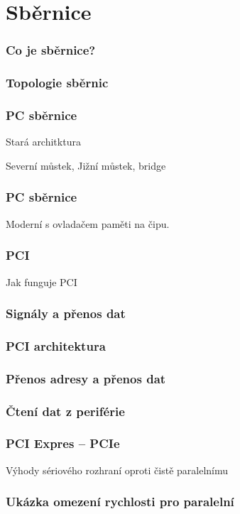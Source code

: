 \documentclass{beamer}
\begin{document}
\section{Sběrnice}

\begin{frame}
\frametitle{Co je sběrnice?}

\end{frame}

\begin{frame}
\frametitle{Topologie sběrnic}

\end{frame}

\begin{frame}
\frametitle{PC sběrnice}
Stará architktura

Severní můstek, Jižní můstek, bridge
\end{frame}

\begin{frame}
\frametitle{PC sběrnice}

Moderní s ovladačem paměti na čipu.
\end{frame}

\begin{frame}
\frametitle{PCI}

Jak funguje PCI
\end{frame}

\begin{frame}
\frametitle{Signály a přenos dat}

\end{frame}

\begin{frame}
\frametitle{PCI architektura}

\end{frame}

\begin{frame}
\frametitle{Přenos adresy a přenos dat}

\end{frame}

\begin{frame}
\frametitle{Čtení dat z periférie}

\end{frame}

\begin{frame}
\frametitle{PCI Expres -- PCIe}

Výhody sériového rozhraní oproti čistě paralelnímu

\end{frame}

\begin{frame}
\frametitle{Ukázka omezení rychlosti pro paralelní}

\end{frame}
\end{document}
